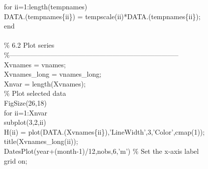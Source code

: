 \hspace{1mm}\textcolor{matlabblue}{for} ii=1:length(tempnames) \\ 
\hspace{1mm}\hspace{5mm} DATA.(tempnames\{ii\}) = tempscale(ii)*DATA.(tempnames\{ii\}); \\ 
\hspace{1mm}\textcolor{matlabblue}{end} \\ 
\hspace{1mm} \\ 
\hspace{1mm}\textcolor{matlabgreen}{\% 6.2 Plot series }\\ 
\hspace{1mm}\textcolor{matlabgreen}{\%--------------------------------------------------------------------------  }\\ 
\hspace{1mm}Xvnames      = vnames; \\ 
\hspace{1mm}Xvnames\_long = vnames\_long; \\ 
\hspace{1mm}Xnvar        = length(Xvnames); \\ 
\hspace{1mm}\textcolor{matlabgreen}{\% Plot selected data }\\ 
\hspace{1mm}FigSize(26,18) \\ 
\hspace{1mm}\textcolor{matlabblue}{for} ii=1:Xnvar \\ 
\hspace{1mm}\hspace{5mm} subplot(3,2,ii) \\ 
\hspace{1mm}\hspace{5mm} H(ii) = plot(DATA.(Xvnames\{ii\}),\textcolor{matlabpurple}{'LineWidth'},3,\textcolor{matlabpurple}{'Color'},cmap(1)); \\ 
\hspace{1mm}\hspace{5mm} title(Xvnames\_long(ii));  \\ 
\hspace{1mm}\hspace{5mm} DatesPlot(year+(month-1)/12,nobs,6,\textcolor{matlabpurple}{'m'}) \textcolor{matlabgreen}{\% Set the x-axis label  }\\ 
\hspace{1mm}\hspace{5mm} grid on;  \\ 
